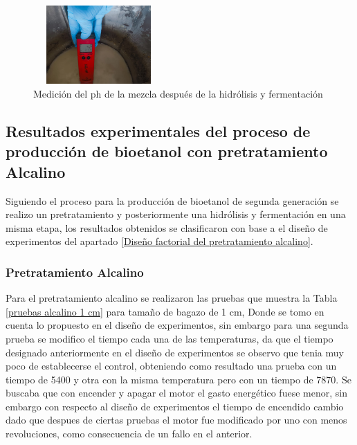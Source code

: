 \documentclass[12pt]{article}
\begin{document}
	     	
	     		   	\begin{figure}[H]
	     		\centering
	     		\includegraphics[width=5cm, height=3cm]{imagenes/hidrolisis7}
	     		\caption{ Medición del ph de la mezcla después de la hidrólisis y fermentación}
	     		\label{hidrolisis 7}
	     	\end{figure}
	     	
	     	
	     	
	     	
			
			
			\newpage

				\subsection{Resultados experimentales del proceso de producción de bioetanol con pretratamiento Alcalino}
				Siguiendo el proceso para la producción de bioetanol de segunda generación se realizo un pretratamiento y posteriormente una hidrólisis y fermentación en una misma etapa, los resultados obtenidos se clasificaron con base a el diseño de experimentos del apartado \ref{Diseño factorial del pretratamiento alcalino}.
				
				
				
				\subsubsection{Pretratamiento Alcalino}
				
				
	Para el pretratamiento alcalino se realizaron las pruebas que muestra la Tabla \ref{pruebas alcalino 1 cm} para tamaño de bagazo de 1 cm, Donde se tomo en cuenta lo propuesto en el diseño de experimentos, sin embargo para una segunda prueba se modifico el tiempo cada una de las temperaturas, da que el tiempo designado anteriormente en el diseño de experimentos se observo que tenia muy poco de establecerse el control, obteniendo como resultado una prueba con un tiempo de 5400 y otra con la misma temperatura pero con un tiempo de 7870. Se buscaba que con encender y apagar el motor el gasto energético fuese menor, sin embargo con respecto al diseño de experimentos el tiempo de encendido cambio dado que despues de ciertas pruebas el motor fue modificado por uno con menos revoluciones, como consecuencia de un fallo en el anterior.
	
\end{document}

